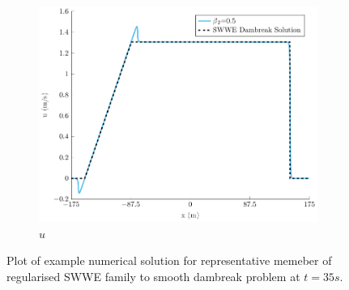 \documentclass[10pt]{article}
\begin{document}
\begin{figure}
\begin{subfigure}{0.32\textwidth}
	\includegraphics[width=\textwidth]{./Figures/Simulations/Study/RegSWWE/Convergence/u.pdf}
	\caption{$u$}
	\end{subfigure}
	\caption{Plot of example numerical solution for representative memeber of regularised SWWE family to smooth dambreak problem at $t=35s$.}
\end{figure}
\end{document}
